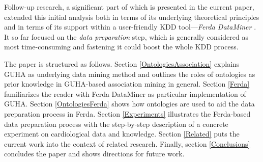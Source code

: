 Follow-up research, a significant part of which is presented in the current paper, extended this initial analysis both in terms of its underlying theoretical principles \cite{Ralbovsky} and in terms of its support within a user-friendly KDD tool---\emph{Ferda DataMiner} \cite{Zeman}.
It so far focused on the \emph{data preparation} step, which is generally considered as most time-consuming and fastening it could boost the whole KDD process. 



The paper is structured as follows. 
Section \ref{OntologiesAssociation} explains GUHA as underlying data mining method and outlines the roles of ontologies as prior knowledge in GUHA-based association mining in general. 
Section \ref{Ferda} familiarizes the reader with Ferda DataMiner as particular implementation of GUHA. 
Section \ref{OntologiesFerda} shows how ontologies are used to aid the data preparation process in Ferda. 
Section \ref{Experiments} illustrates the Ferda-based data preparation process with the step-by-step description of a concrete experiment on cardiological data and knowledge. 
Section \ref{Related} puts the current work into the context of related research. 
Finally, section \ref{Conclusions} concludes the paper and shows directions for future work. 